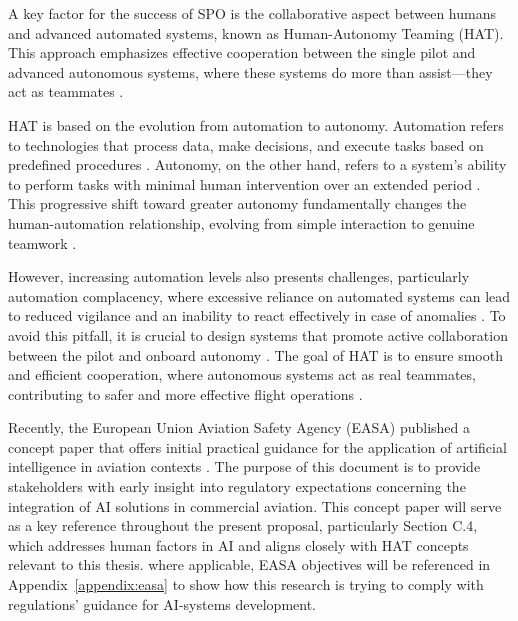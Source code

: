 \documentclass[12pt,a4paper]{article} %
\begin{document}
	A key factor for the success of SPO is the collaborative aspect between humans and advanced automated systems, known as Human-Autonomy Teaming (HAT). This approach emphasizes effective cooperation between the single pilot and advanced autonomous systems, where these systems do more than assist—they act as teammates \parencite{shively_autonomy_2017}.
	
	HAT is based on the evolution from automation to autonomy. Automation refers to technologies that process data, make decisions, and execute tasks based on predefined procedures \parencite{hoff_trust_2015, hancock_imposing_2017}. Autonomy, on the other hand, refers to a system's ability to perform tasks with minimal human intervention over an extended period \parencite{endsley_here_2017, holbrook_enabling_2020}. This progressive shift toward greater autonomy fundamentally changes the human-automation relationship, evolving from simple interaction to genuine teamwork \parencite{endsley_here_2017}.
	
	However, increasing automation levels also presents challenges, particularly automation complacency, where excessive reliance on automated systems can lead to reduced vigilance and an inability to react effectively in case of anomalies \parencite{lee_design_2023}. To avoid this pitfall, it is crucial to design systems that promote active collaboration between the pilot and onboard autonomy \parencite{endsley_here_2017}. The goal of HAT is to ensure smooth and efficient cooperation, where autonomous systems act as real teammates, contributing to safer and more effective flight operations \parencite{mcneese_chapter_2020}.

	Recently, the European Union Aviation Safety Agency (EASA) published a concept paper that offers initial practical guidance for the application of artificial intelligence in aviation contexts \parencite{easa_guidance_2024}. The purpose of this document is to provide stakeholders with early insight into regulatory expectations concerning the integration of AI solutions in commercial aviation. This concept paper will serve as a key reference throughout the present proposal, particularly Section C.4, which addresses human factors in AI and aligns closely with HAT concepts relevant to this thesis. where applicable, EASA objectives will be referenced in Appendix~\ref{appendix:easa} to show how this research is trying to comply with regulations' guidance for AI-systems development.
\end{document}
